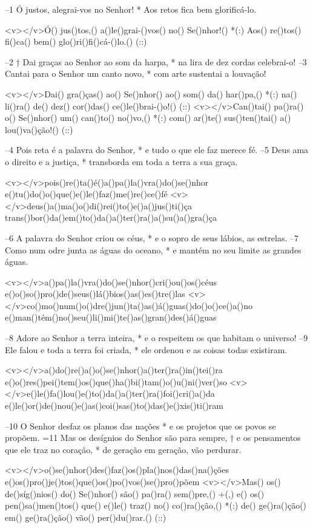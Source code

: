 –1 Ó justos, alegrai-vos no Senhor! *
Aos retos fica bem glorificá-lo.


<v></v>Ó() jus()tos,() a()le()grai-()vos() no() Se()nhor!() *(:)
Aos() re()tos() fi()ca() bem() glo()ri()fi()cá-()lo.() (::)

–2 † Dai graças ao Senhor ao som da harpa, *
na lira de dez cordas celebrai-o!
–3 Cantai para o Senhor um canto novo, *
com arte sustentai a louvação!

<v></v>Dai() gra()ças() ao() Se()nhor() ao() som() da() har()pa,() *(:)
na() li()ra() de() dez() cor()das() ce()le()brai-()o!() (::)
<v></v>Can()tai() pa()ra() o() Se()nhor() um() can()to() no()vo,() *(:)
com() ar()te() sus()ten()tai() a() lou()va()ção!() (::)

–4 Pois reta é a palavra do Senhor, *
e tudo o que ele faz merece fé.
–5 Deus ama o direito e a justiça, *
transborda em toda a terra a sua graça.

<v></v>pois()re()ta()é()a()pa()la()vra()do()se()nhor
e()tu()do()o()que()e()le()faz()me()re()ce()fé
<v></v>deus()a()ma()o()di()rei()to()e()a()jus()ti()ça
trans()bor()da()em()to()da()a()ter()ra()a()su()a()gra()ça

–6 A palavra do Senhor criou os céus, *
e o sopro de seus lábios, as estrelas.
–7 Como num odre junta as águas do oceano, *
e mantém no seu limite as grandes águas.

<v></v>a()pa()la()vra()do()se()nhor()cri()ou()os()céus
e()o()so()pro()de()seus()lá()bios()as()es()tre()las
<v></v>co()mo()num()o()dre()jun()ta()as()á()guas()do()o()ce()a()no
e()man()tém()no()seu()li()mi()te()as()gran()des()á()guas

–8 Adore ao Senhor a terra inteira, *
e o respeitem os que habitam o universo!
–9 Ele falou e toda a terra foi criada, *
ele ordenou e as coisas todas existiram.

<v></v>a()do()re()a()o()se()nhor()a()ter()ra()in()tei()ra
e()o()res()pei()tem()os()que()ha()bi()tam()o()u()ni()ver()so
<v></v>e()le()fa()lou()e()to()da()a()ter()ra()foi()cri()a()da
e()le()or()de()nou()e()as()coi()sas()to()das()e()xis()ti()ram

–10 O Senhor desfaz os planos das nações *
e os projetos que os povos se propõem.
=11 Mas os desígnios do Senhor são para sempre, †
e os pensamentos que ele traz no coração, *
de geração em geração, vão perdurar.

<v></v>o()se()nhor()des()faz()os()pla()nos()das()na()ções
e()os()pro()je()tos()que()os()po()vos()se()pro()põem
<v></v>Mas() os() de()síg()nios() do() Se()nhor() são() pa()ra() sem()pre,() +(,)
e() os() pen()sa()men()tos() que() e()le() traz() no() co()ra()ção,() *(:)
de() ge()ra()ção() em() ge()ra()ção() vão() per()du()rar.() (::)

